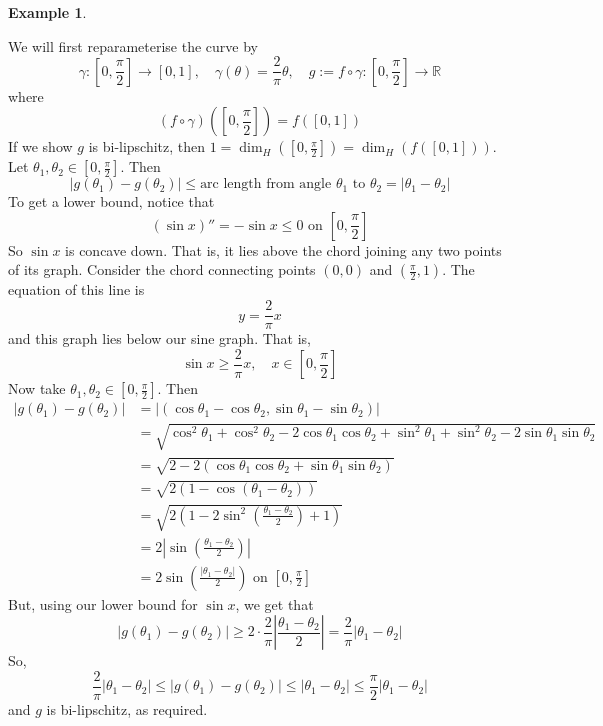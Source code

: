 \documentclass{article}
\theoremstyle{plain}
\theoremstyle{definition}
\newtheorem*{ex}{Example}
\theoremstyle{remark}
\begin{document}
\begin{ex}
\begin{center}
    
\end{center}
    We will first reparameterise the curve by \[\gamma :\left [0, \frac{\pi }{2} \right ] \to [0,1], \quad \gamma (\theta) = \frac{2}{\pi} \theta, \quad g:=f \circ \gamma :\left [0, \frac{\pi}{2}\right ] \to \mathbb{R}\]
    where \[
    (f\circ \gamma ) \left ( \left[0, \frac{\pi}{2} \right]\right ) = f([0,1])
    \]
   If we show $g$ is bi-lipschitz, then $1=\dim _H(\left[0, \frac{\pi}{2} \right]) = \dim _H(f([0,1]))$. Let $\theta _1, \theta _2 \in \left[0, \frac{\pi}{2} \right ]$. Then \[
    |g(\theta _1) - g(\theta _2)| \le \text{arc length from angle } \theta _1 \text{ to } \theta _2 =  |\theta _1 - \theta _2| 
    \]
    To get a lower bound, notice that \[
    (\sin x)'' = -\sin x \le 0 \text{ on } \left[0, \frac{\pi}{2}\right]
    \]
    So $\sin x$ is concave down. That is, it lies above the chord joining any two points of its graph. Consider the chord connecting points $(0, 0)$ and $\left ( \frac{\pi}{2}, 1\right )$. The equation of this line is \[
    y = \frac{2}{\pi}x
    \]
    and this graph lies below our sine graph. That is, \[
    \sin x \ge \frac{2}{\pi} x , \quad x \in \left [ 0, \frac{\pi}{2}\right ]
    \]
    Now take $\theta_1, \theta _2 \in \left [ 0, \frac{\pi}{2}\right ]$. Then \begin{align*}
    |g(\theta _1) - g(\theta _2)| &= |(\cos \theta _1 - \cos \theta _2, \sin \theta_1 - \sin \theta _2)|      
    \\ &=\sqrt{\cos ^2 \theta _1 + \cos ^2 \theta _2 - 2 \cos \theta _1 \cos \theta _2 + \sin ^2 \theta _1 + \sin ^2 \theta _2 - 2\sin \theta_1 \sin \theta_2} \\ &=\sqrt{2-2(\cos \theta _1 \cos \theta _2 + \sin \theta _1 \sin \theta _2)} \\ & = \sqrt{2(1-\cos (\theta _1 -\theta _2))} \\ &=\sqrt{2 \left (1-2\sin ^2 \left ( \frac{\theta _1 - \theta _2}{2} \right ) +1\right )}
    \\ & = 2 \left |\sin \left ( \frac{\theta _1 - \theta _2}{2}\right ) \right| \\ & = 2 \sin \left ( \frac{|\theta _1 - \theta _2|}{2}\right ) \text{ on } \left [ 0, \frac{\pi}{2}\right ]
    \end{align*}
    But, using our lower bound for $\sin x$, we get that \[
    |g(\theta _1) - g(\theta _2)| \ge 2 \cdot \frac{2}{\pi} \left | \frac{\theta_1 - \theta _2}{2}\right | = \frac{2}{\pi} |\theta _1 - \theta _2|
    \]
    So, \[
    \frac{2}{\pi} |\theta _1 - \theta _2| \le |g(\theta_1) - g(\theta_2)| \le |\theta _1 - \theta _2| \le \frac{\pi}{2} |\theta _1 - \theta _2|
    \]
    and $g$ is bi-lipschitz, as required.

\end{ex}
\end{document}

